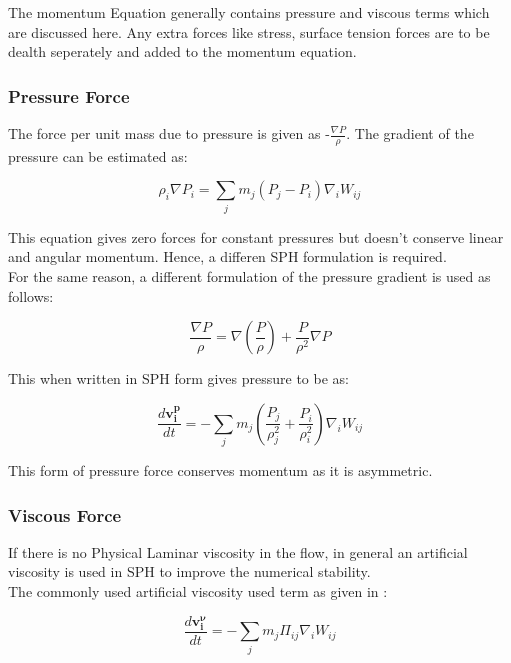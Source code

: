 The momentum Equation generally contains pressure and viscous terms which are discussed here.
Any extra forces like stress, surface tension forces are to be dealth
seperately and added to the momentum equation.

\subsubsection{Pressure Force}

The force per unit mass due to pressure is given as -$\frac{\nabla P}{\rho}$.
The gradient of the pressure can be estimated as:

\begin{equation}
 \rho_i \nabla P_i = \sum_j m_j (P_j - P_i) \nabla_i W_{ij}
\end{equation}

This equation gives zero forces for constant pressures but doesn't
conserve linear and angular momentum. Hence, a differen SPH formulation
is required.\\

For the same reason, a different formulation of the pressure gradient is used as follows:

\begin{equation}
 \frac{\nabla P}{\rho} = \nabla \left( \frac{P}{\rho}\right) + \frac{P}{\rho^2}\nabla P
\end{equation}

This when written in SPH form gives pressure to be as:

\begin{equation}
 \frac{d\mathbf{v_i^p}}{dt} = -\sum_j m_j \left( \frac{P_j}{\rho_j^2} + \frac{P_i}{\rho_i^2}\right)\nabla_i W_{ij}
\end{equation}

\noindent
This form of pressure force conserves momentum as it is asymmetric. 

\subsubsection{Viscous Force}

If there is no Physical Laminar viscosity in the flow, in general
an artificial viscosity is used in SPH to improve the numerical stability.\\

The commonly used artificial viscosity used term as given in \cite{Monaghan1983}:

\begin{equation}
 \frac{d\mathbf{v_i^\nu}}{dt} = - \sum_j m_j \Pi_{ij} \nabla_i W_{ij}
\end{equation}

